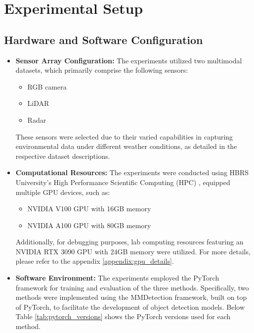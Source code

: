\documentclass[report.tex]{subfiles}
\begin{document}
    \section{Experimental Setup}

        \subsection{Hardware and Software Configuration}
        \begin{itemize}
            \item \textbf{Sensor Array Configuration:} The experiments utilized two multimodal datasets, which primarily comprise the following sensors:
                \begin{itemize}
                    \item RGB camera
                    \item LiDAR
                    \item Radar
                \end{itemize}
                These sensors were selected due to their varied capabilities in capturing environmental data under different weather conditions, as detailed in the respective dataset descriptions.

            \item \textbf{Computational Resources:} The experiments were conducted using HBRS University's High Performance Scientific Computing (HPC) \cite{hbrs_scientificComputing2023}, equipped multiple GPU devices, such as:
                \begin{itemize}
                    \item NVIDIA V100 GPU with 16GB memory
                    \item NVIDIA A100 GPU with 80GB memory
                \end{itemize}
                Additionally, for debugging purposes, lab computing resources featuring an NVIDIA RTX 3090 GPU with 24GB memory were utilized. For more details, please refer to the appendix \ref{appendix:gpu_details}. 

            \item \textbf{Software Environment:} The experiments employed the PyTorch framework for training and evaluation of the three methods. Specifically, two methods were implemented using the MMDetection framework, built on top of PyTorch, to facilitate the development of object detection models. Below Table \ref{tab:pytorch_versions} shows the PyTorch versions used for each method.
            

\end{itemize}
\end{document}
